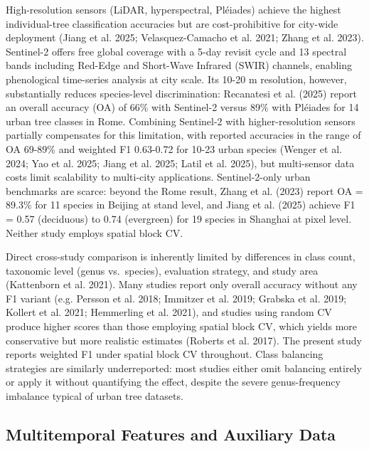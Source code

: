 \documentclass[11pt,a4paper]{scrartcl}
\begin{document}
High-resolution sensors (LiDAR, hyperspectral, Pléiades) achieve the
highest individual-tree classification accuracies but are
cost-prohibitive for city-wide deployment (Jiang et al. 2025;
{Velasquez-Camacho et al.} 2021; Zhang et al. 2023). Sentinel-2 offers
free global coverage with a 5-day revisit cycle and 13 spectral bands
including Red-Edge and Short-Wave Infrared (SWIR) channels, enabling
phenological time-series analysis at city scale. Its 10-20 m resolution,
however, substantially reduces species-level discrimination: Recanatesi
et al. (2025) report an overall accuracy (OA) of 66\% with Sentinel-2
versus 89\% with Pléiades for 14 urban tree classes in Rome. Combining
Sentinel-2 with higher-resolution sensors partially compensates for this
limitation, with reported accuracies in the range of OA 69-89\% and
weighted F1 0.63-0.72 for 10-23 urban species (Wenger et al. 2024; Yao
et al. 2025; Jiang et al. 2025; Latil et al. 2025), but multi-sensor
data costs limit scalability to multi-city applications. Sentinel-2-only
urban benchmarks are scarce: beyond the Rome result, Zhang et al. (2023)
report OA = 89.3\% for 11 species in Beijing at stand level, and Jiang
et al. (2025) achieve F1 = 0.57 (deciduous) to 0.74 (evergreen) for 19
species in Shanghai at pixel level. Neither study employs spatial block
CV.

Direct cross-study comparison is inherently limited by differences in
class count, taxonomic level (genus vs.~species), evaluation strategy,
and study area (Kattenborn et al. 2021). Many studies report only
overall accuracy without any F1 variant (e.g. Persson et al. 2018;
Immitzer et al. 2019; Grabska et al. 2019; Kollert et al. 2021;
Hemmerling et al. 2021), and studies using random CV produce higher
scores than those employing spatial block CV, which yields more
conservative but more realistic estimates (Roberts et al. 2017). The
present study reports weighted F1 under spatial block CV throughout.
Class balancing strategies are similarly underreported: most studies
either omit balancing entirely or apply it without quantifying the
effect, despite the severe genus-frequency imbalance typical of urban
tree datasets.

\subsection{Multitemporal Features and Auxiliary
Data}\label{multitemporal-features-and-auxiliary-data}
\end{document}
